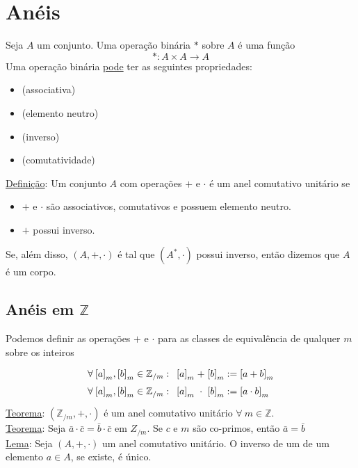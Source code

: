 \documentclass{article}
\begin{document}
\section{Anéis}
Seja $A$ um conjunto. Uma operação binária $*$ sobre $A$ é uma função
\[ *: A \times A \to A \]
Uma operação binária \uline{pode} ter as seguintes propriedades:
\begin{itemize}
  \item {} (associativa)
  \item {} (elemento neutro)
  \item {} (inverso)
  \item {} (comutatividade)
\end{itemize}
\vspace{10pt}
\uline{Definição}: Um conjunto $A$ com operações $+$ e $\cdot$ é um anel comutativo unitário se
\begin{itemize}
  \item $+$ e $\cdot$ são associativos, comutativos e possuem elemento neutro.
  \item $+$ possui inverso.
\end{itemize}
\vspace{5pt}
Se, além disso, $(A, +, \cdot)$ é tal que $(A^*, \cdot)$ possui inverso, então dizemos que $A$ é um corpo.


\subsection{Anéis em $\mathbb{Z}$}
Podemos definir as operações $+$ e $\cdot$ para as classes de equivalência de qualquer $m$ sobre os inteiros
\[
  \arraycolsep=1.4pt\def\arraystretch{1.5}
  \begin{array}{lcl}
    \forall\: {[a]}_m, {[b]}_m \in \mathbb{Z}_{/m}: \enspace {[a]}_m & + & {[b]}_m := {[a + b]}_m \\
    \forall\: {[a]}_m, {[b]}_m \in \mathbb{Z}_{/m}: \enspace {[a]}_m & \cdot & {[b]}_m := {[a \cdot b]}_m
  \end{array}
\]
\uline{Teorema}: $(\mathbb{Z}_{/m}, +, \cdot)$ é um anel comutativo unitário $\forall\: m \in \mathbb{Z}$. \\[5pt]
\uline{Teorema}: Seja $\bar{a} \cdot \bar{c} = \bar{b} \cdot \bar{c}$ em $Z_{/m}$. Se $c$ e $m$ são co-primos, então $\bar{a} = \bar{b}$ \\[5pt]
\uline{Lema}: Seja $(A, +, \cdot)$ um anel comutativo unitário. O inverso de um de um elemento $a \in A$, se existe, é único.
\end{document}
